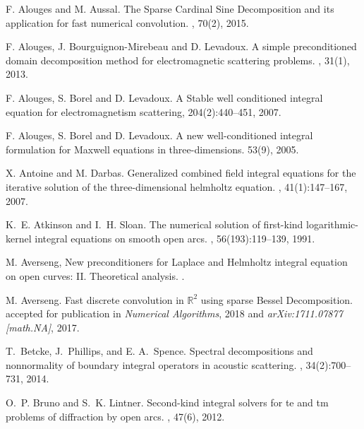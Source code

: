 \documentclass[a4paper]{subfiles}
\begin{document}
\begin{thebibliography}{10}

F. Alouges and M. Aussal. \newblock The Sparse Cardinal Sine Decomposition and its application for fast numerical convolution. , 70(2), 2015.

F. Alouges, J. Bourguignon-Mirebeau and D. Levadoux. 
\newblock A simple preconditioned domain decomposition method for electromagnetic scattering problems. , 31(1), 2013.

F. Alouges, S. Borel and D. Levadoux. 
\newblock A Stable well conditioned integral equation for electromagnetism scattering,  204(2):440--451, 2007.

F. Alouges, S. Borel and D. Levadoux.
\newblock  A new well-conditioned integral formulation for Maxwell equations in three-dimensions. 
 53(9), 2005.

X. Antoine and M. Darbas.
\newblock Generalized combined field integral equations for the iterative
  solution of the three-dimensional helmholtz equation.
,
  41(1):147--167, 2007.

K.~E. Atkinson and I.~H. Sloan.
\newblock The numerical solution of first-kind logarithmic-kernel integral
  equations on smooth open arcs.
, 56(193):119--139, 1991.

M. Averseng,
\newblock New preconditioners for Laplace and  Helmholtz integral equation on open curves: II. Theoretical analysis.
.

M. Averseng. 
\newblock Fast discrete convolution in $\mathbb{R}^2$ using sparse Bessel Decomposition.
\newblock accepted for publication in {\em Numerical Algorithms}, 2018 and {\em arXiv:1711.07877 [math.NA]}, 2017.

T.~Betcke, J.~Phillips, and E. A.~Spence.
\newblock Spectral decompositions and nonnormality of boundary integral
  operators in acoustic scattering.
, 34(2):700--731, 2014.

O.~P. Bruno and S.~K. Lintner.
\newblock Second-kind integral solvers for te and tm problems of diffraction by
  open arcs.
, 47(6), 2012.


\end{thebibliography}
\end{document}
